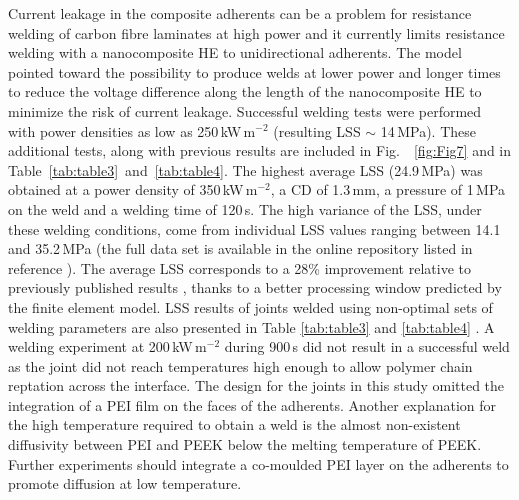 \documentclass[review,times,sagev,doublespace]{sagej}
\begin{document}
Current leakage in the composite adherents can be a problem for resistance welding of carbon fibre laminates at high power and it currently limits resistance welding with a nanocomposite HE to unidirectional adherents. 
The model pointed toward the possibility to produce welds at lower power and longer times to reduce the voltage difference along the length of the nanocomposite HE to minimize the risk of current leakage. 
Successful welding tests were performed with power densities as low as \mbox{250\,kW\,m$^{-2}$} (resulting LSS $\sim$ \mbox{14\,MPa}). 
These additional tests, along with previous results are included in \mbox{Fig.~ \ref{fig:Fig7}} and in \mbox{Table \ref{tab:table3} and \ref{tab:table4}}. 
The highest average LSS (\mbox{24.9\,MPa}) was obtained at a power density of \mbox{350\,kW\,m$^{-2}$}, a {CD} of \mbox{1.3\,mm}, a pressure of \mbox{1\,MPa} on the weld and a welding time of \mbox{120\,s}. 
{
The high variance of the LSS, under these welding conditions, come from individual LSS values ranging between 14.1 and \mbox{35.2\,MPa} (the full data set is available in the online repository listed in reference \cite{Brassard2019b}). 
The average} LSS corresponds to a 28\% improvement relative to previously published results \cite{Brassard2019a}, thanks to a better processing window predicted by the finite element model. 
LSS results of joints welded using non-optimal sets of welding parameters are also presented in Table \ref{tab:table3} and \ref{tab:table4} \cite{Brassard2019b}. 
A welding experiment at \mbox{200\,kW\,m$^{-2}$} during \mbox{900\,s} did not result in a successful weld {as the joint did not reach temperatures high enough to allow polymer chain reptation across the interface.  }
{
The design for the joints in this study omitted the integration of a PEI film on the faces of the adherents. 
Another explanation for the high temperature required to obtain a weld is the almost non-existent diffusivity between PEI and PEEK below the melting temperature of PEEK. 
Further experiments should integrate a co-moulded PEI layer on the adherents to promote diffusion at low temperature. 
}
\end{document}
